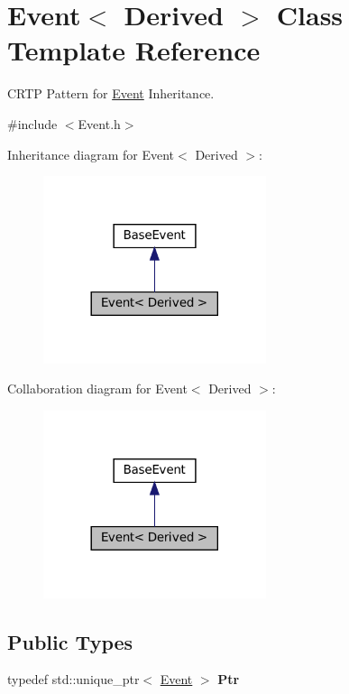 \hypertarget{classEvent}{}\section{Event$<$ Derived $>$ Class Template Reference}
\label{classEvent}


C\+R\+TP Pattern for \hyperlink{classEvent}{Event} Inheritance.  




{\ttfamily \#include $<$Event.\+h$>$}



Inheritance diagram for Event$<$ Derived $>$\+:\nopagebreak
\begin{figure}[H]
\begin{center}
\leavevmode
\includegraphics[width=185pt]{classEvent__inherit__graph}
\end{center}
\end{figure}


Collaboration diagram for Event$<$ Derived $>$\+:\nopagebreak
\begin{figure}[H]
\begin{center}
\leavevmode
\includegraphics[width=185pt]{classEvent__coll__graph}
\end{center}
\end{figure}
\subsection*{Public Types}
\begin{DoxyCompactItemize}
\item 
\mbox{\label{classEvent_a05cd2012a9acae50352453b73bb8debd}} 
typedef std\+::unique\+\_\+ptr$<$ \hyperlink{classEvent}{Event} $>$ {\bfseries Ptr}
\end{DoxyCompactItemize}
